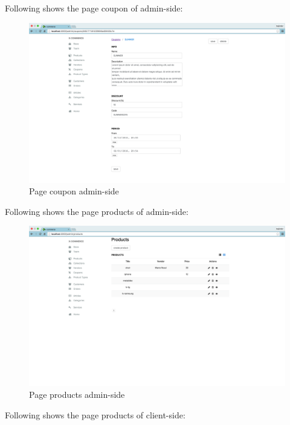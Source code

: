 Following shows the page coupon of admin-side:
\begin{figure}[htb]
\centering
\includegraphics[width=1.0\linewidth]{images/chapter4/page-coupon-all.png}\hfill
\caption[page vendor admin-side]{Page coupon admin-side}
\label{fig:page_coupon_admin_side}
\end{figure}
Following shows the page products of admin-side:
\begin{figure}[htb]
\centering
\includegraphics[width=1.0\linewidth]{images/chapter4/page-products-all.png}\hfill
\caption[page products admin-side]{Page products admin-side}
\label{fig:page_products_admin_side}
\end{figure}
Following shows the page products of client-side:
